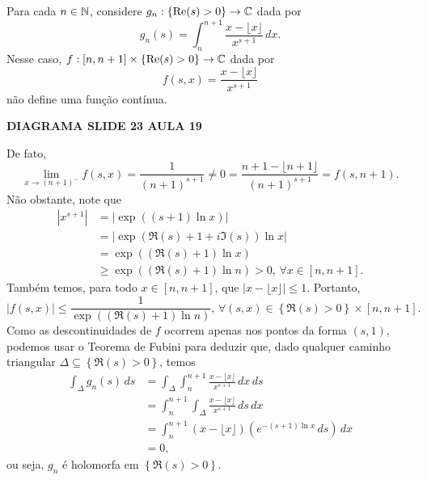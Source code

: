 \begin{exemplo}
Para cada $n\in\mathbb{N}$, considere $g_n:\{ \mathrm{Re}(s) > 0 \} \to \mathbb{C}$ dada por
%
\[
g_n(s) = \int_n^{n+1} \frac{x - \lfloor x \rfloor}{x^{s+1}} \, dx.
\]
%
Nesse caso, $f: [n, n+1]\times \{ \mathrm{Re}(s) > 0 \} \to \mathbb{C}$ 
dada por
%
\[
f(s,x) = \frac{x - \lfloor x \rfloor}{x^{s+1}}
\]
%
não define uma função contínua.
%
\begin{center}
    {\bf DIAGRAMA SLIDE 23 AULA 19}
\end{center}
%
De fato,
%
\[
\lim_{x\to (n+1)^-} f(s,x)
= \frac{1}{(n+1)^{s+1}}
\neq 0 
= \frac{n+1 - \lfloor n+1 \rfloor}{(n+1)^{s+1}}
= f(s,n+1).
\]
%
Não obstante, note que
%
\begin{align*}
    |x^{s+1}| &= \left|\exp((s+1)\ln x)\right| \\
              &= \left|\exp\left( \Re(s) + 1 + i\Im(s) \right) \ln x\right| \\
              &= \exp\left( (\Re(s) + 1)\ln x \right) \\
              &\geq \exp\left( (\Re(s) + 1)\ln n \right) > 0, \, \forall x\in [n,n+1].
\end{align*}
%
Também temos, para todo $x\in[n,n+1]$, que $|x - \lfloor x \rfloor| \leq 1$. Portanto,
%
\[
|f(s,x)| \leq \frac{1}{\exp\left( (\Re(s) + 1)\ln n \right)}, \, 
\forall (s,x) \in \left\{ \Re(s) > 0 \right\}\times[n,n+1].
\]
%
Como as descontinuidades de $f$ ocorrem apenas nos pontos da forma $(s,1)$, podemos
usar o Teorema de Fubini para deduzir que, dado qualquer caminho triangular
$\Delta \subseteq \left\{ \Re(s) > 0 \right\}$, temos
%
\begin{align*}
    \int_{\Delta} g_n(s) \, ds 
    &= \int_{\Delta} \int_n^{n+1} \frac{x - \lfloor x \rfloor}{x^{s+1}} \, dx \, ds \\
    &= \int_n^{n+1} \int_{\Delta} \frac{x - \lfloor x \rfloor}{x^{s+1}} \, ds \, dx \\
    &= \int_n^{n+1} (x - \lfloor x \rfloor) \left( e^{-(s+1)\ln x} \, ds \right) \, dx \\
    &= 0,
\end{align*}
%
ou seja, $g_n$ é holomorfa em $\left\{ \Re(s) > 0 \right\}$.


\end{exemplo}
